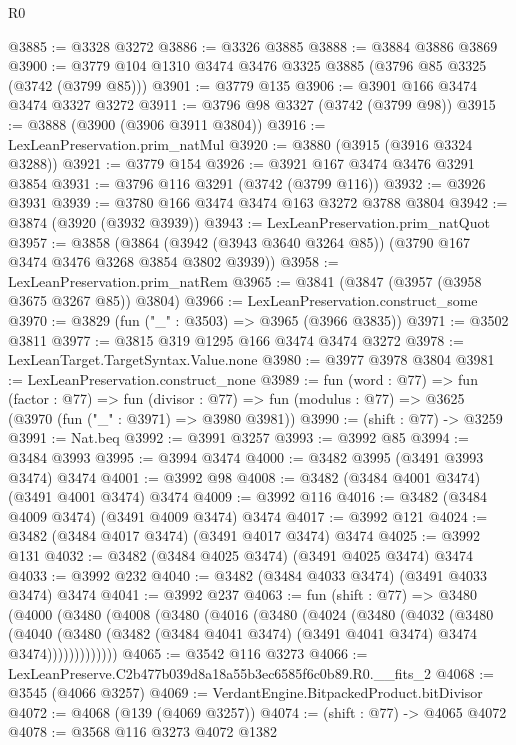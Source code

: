 \begin{lexlean}{R0}
\begin{coremodule}
@3885 := @3328 @3272
@3886 := @3326 @3885
@3888 := @3884 @3886 @3869
@3900 := @3779 @104 @1310 @3474 @3476 @3325 @3885 (@3796 @85 @3325 (@3742 (@3799 @85)))
@3901 := @3779 @135
@3906 := @3901 @166 @3474 @3474 @3327 @3272
@3911 := @3796 @98 @3327 (@3742 (@3799 @98))
@3915 := @3888 (@3900 (@3906 @3911 @3804))
@3916 := LexLeanPreservation.prim_natMul
@3920 := @3880 (@3915 (@3916 @3324 @3288))
@3921 := @3779 @154
@3926 := @3921 @167 @3474 @3476 @3291 @3854
@3931 := @3796 @116 @3291 (@3742 (@3799 @116))
@3932 := @3926 @3931
@3939 := @3780 @166 @3474 @3474 @163 @3272 @3788 @3804
@3942 := @3874 (@3920 (@3932 @3939))
@3943 := LexLeanPreservation.prim_natQuot
@3957 := @3858
    (@3864 (@3942 (@3943 @3640 @3264 @85)) (@3790 @167 @3474 @3476 @3268 @3854 @3802 @3939))
@3958 := LexLeanPreservation.prim_natRem
@3965 := @3841 (@3847 (@3957 (@3958 @3675 @3267 @85)) @3804)
@3966 := LexLeanPreservation.construct_some
@3970 := @3829 (fun ("_" : @3503) => @3965 (@3966 @3835))
@3971 := @3502 @3811
@3977 := @3815 @319 @1295 @166 @3474 @3474 @3272
@3978 := LexLeanTarget.TargetSyntax.Value.none
@3980 := @3977 @3978 @3804
@3981 := LexLeanPreservation.construct_none
@3989 := fun (word : @77) =>
  fun (factor : @77) =>
  fun (divisor : @77) => fun (modulus : @77) => @3625 (@3970 (fun ("_" : @3971) => @3980 @3981))
@3990 := (shift : @77) -> @3259
@3991 := Nat.beq
@3992 := @3991 @3257
@3993 := @3992 @85
@3994 := @3484 @3993
@3995 := @3994 @3474
@4000 := @3482 @3995 (@3491 @3993 @3474) @3474
@4001 := @3992 @98
@4008 := @3482 (@3484 @4001 @3474) (@3491 @4001 @3474) @3474
@4009 := @3992 @116
@4016 := @3482 (@3484 @4009 @3474) (@3491 @4009 @3474) @3474
@4017 := @3992 @121
@4024 := @3482 (@3484 @4017 @3474) (@3491 @4017 @3474) @3474
@4025 := @3992 @131
@4032 := @3482 (@3484 @4025 @3474) (@3491 @4025 @3474) @3474
@4033 := @3992 @232
@4040 := @3482 (@3484 @4033 @3474) (@3491 @4033 @3474) @3474
@4041 := @3992 @237
@4063 := fun (shift : @77) =>
  @3480
    (@4000
      (@3480
        (@4008
          (@3480
            (@4016
              (@3480
                (@4024
                  (@3480
                    (@4032
                      (@3480
                        (@4040
                          (@3480
                            (@3482 (@3484 @4041 @3474) (@3491 @4041 @3474) @3474 @3474)))))))))))))
@4065 := @3542 @116 @3273
@4066 := LexLeanPreserve.C2b477b039d8a18a55b3ec6585f6c0b89.R0.__fits_2
@4068 := @3545 (@4066 @3257)
@4069 := VerdantEngine.BitpackedProduct.bitDivisor
@4072 := @4068 (@139 (@4069 @3257))
@4074 := (shift : @77) -> @4065 @4072
@4078 := @3568 @116 @3273 @4072 @1382

\end{coremodule}
\end{lexlean}
